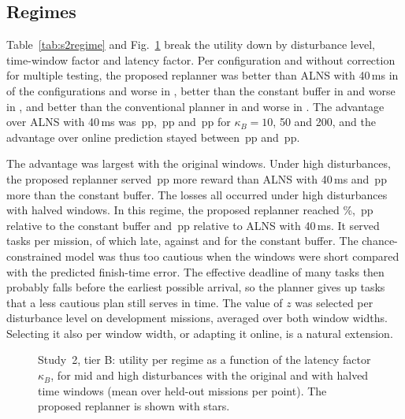 \subsection{Regimes}\label{sec:s2-regime}
Table~\ref{tab:s2regime} and Fig.~\ref{fig:s2regime} break the utility down by disturbance level, time-window factor and
latency factor. Per configuration and without correction for multiple testing, the proposed replanner was better than
ALNS with 40\,ms in  of the  configurations and worse in , better than the
constant buffer in  and worse in , and better than the conventional planner in 
and worse in . The advantage over ALNS with 40\,ms was \,pp, \,pp and
\,pp for $\kappa_B=10$, 50 and 200, and the advantage over online prediction stayed between
\,pp and \,pp.

The advantage was largest with the original windows. Under high disturbances, the proposed replanner served
\,pp more reward than ALNS with 40\,ms and \,pp more than the constant buffer.
The losses all occurred under high disturbances with halved windows. In this regime, the proposed replanner reached
\%, \,pp relative to the constant buffer and \,pp relative
to ALNS with 40\,ms. It served  tasks per mission, of which  late,
against  and  for the constant buffer. The chance-constrained model was
thus too cautious when the windows were short compared with the predicted finish-time error. The effective deadline of
many tasks then probably falls before the earliest possible arrival, so the planner gives up tasks that a less cautious
plan still serves in time. The value of $z$ was selected per disturbance level on development missions, averaged over
both window widths. Selecting it also per window width, or adapting it online, is a natural extension.


\begin{figure}[t]
\centering
{}
\caption{Study~2, tier B: utility per regime as a function of the latency factor $\kappa_B$, for mid and high
disturbances with the original and with halved time windows (mean over  held-out missions per point).
The proposed replanner is shown with stars.}\label{fig:s2regime}
\end{figure}

